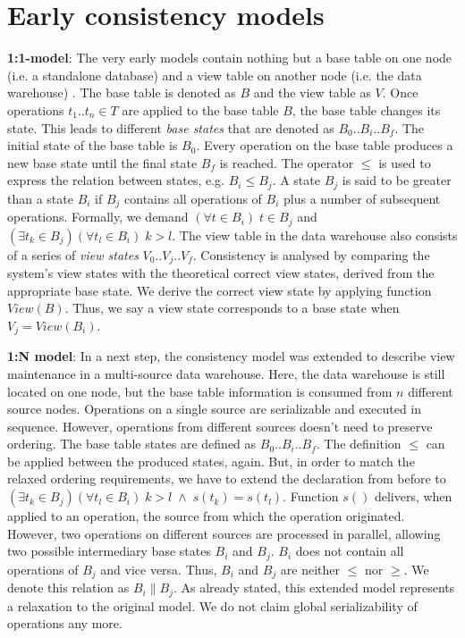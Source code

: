 \section{Early consistency models}
\label{sec:early_models}

 \textbf{1:1-model}: The very early models contain nothing but a base 
table on one node (i.e. a standalone database) and a view table on 
another node (i.e. the data warehouse) \cite{zhuge:view}. The base table 
is denoted as $B$ and the view table as $V$. Once operations $t_1..t_n 
\in T$ are applied to the base table $B$, the base table changes its 
state. This leads to different \textit{base states} that are denoted as 
$B_0..B_i..B_f$. The initial state of the base table is $B_0$. Every 
operation on the base table produces a new base state until the final 
state $B_f$ is reached. The operator $\leq$ is used to express the 
relation between states, e.g. $B_i \leq B_j$. A state $B_j$ is said to 
be greater than a state $B_i$ if $B_j$ contains all operations of $B_i$ 
plus a number of subsequent operations. Formally, we demand $(\forall t 
\in B_i)\;t \in B_j$ and $(\exists t_k \in B_j)(\forall t_l \in B_i)\;k 
> l $. The view table in the data warehouse also consists of a series of 
\textit{view states} $V_0..V_j..V_f$. Consistency is analysed by 
comparing the system's view states with the theoretical correct view 
states, derived from the appropriate base state. We derive the correct 
view state by applying function $View(B)$. Thus, we say a view state 
corresponds to a base state when $V_j=View(B_i)$. 


\textbf{1:N model}: In a next step, the consistency model was extended 
to describe view maintenance in a multi-source data 
warehouse\cite{zhuge:strobe}. Here, the data warehouse is still located 
on one node, but the base table information is consumed from $n$ 
different source nodes. Operations on a single source are serializable 
and executed in sequence. However, operations from different sources 
doesn't need to preserve ordering. The base table states are defined as 
$B_0..B_i..B_f$. The definition $\leq$ can be applied between the 
produced states, again. But, in order to match the relaxed ordering 
requirements, we have to extend the declaration from before to $(\exists 
t_k \in B_j)(\forall t_l \in B_i)\;k > l\;\land\;s(t_k)=s(t_l)$. 
Function $s()$ delivers, when applied to an operation, the source from 
which the operation originated. However, two operations on different 
sources are processed in parallel, allowing two possible intermediary 
base states $B_i$ and $B_j$. $B_i$ does not contain all operations of 
$B_j$ and vice versa. Thus, $B_i$ and $B_j$ are neither $\leq$ nor 
$\geq$. We denote this relation as $B_i \parallel B_j$. As already 
stated, this extended model represents a relaxation to the original 
model. We do not claim global serializability of operations any more. 

